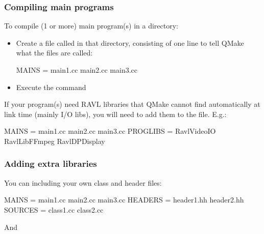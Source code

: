 \documentclass[landscape]{beamer}
\begin{document}
\begin{frame}[fragile]\frametitle{Compiling main programs}

  To compile (1 or more) main program(s) in a directory:
  \begin{itemize}
    \pause\item Create a file called  in that directory,
    consisting of one line to tell QMake what the files are called:

\begin{Code}
  MAINS = main1.cc main2.cc main3.cc
\end{Code}

  \pause\item Execute the command 
  \end{itemize}

  \pause \vspace{2em}

  If your program(s) need RAVL libraries that QMake cannot find automatically
  at link time (mainly I/O libs), you will need to add them to the
   file.  E.g.:

\begin{Code}
  MAINS = main1.cc main2.cc main3.cc
  PROGLIBS = RavlVideoIO RavlLibFFmpeg RavlDPDisplay
\end{Code}
\end{frame}

\begin{frame}[fragile]\frametitle{Adding extra libraries}

  You can including your own class and header files:

  \vspace{2em}

\begin{Code}
  MAINS = main1.cc main2.cc main3.cc
  HEADERS = header1.hh header2.hh
  SOURCES = class1.cc class2.cc
\end{Code}

  \pause\vspace{2em}

  And 
\end{frame}
\end{document}
